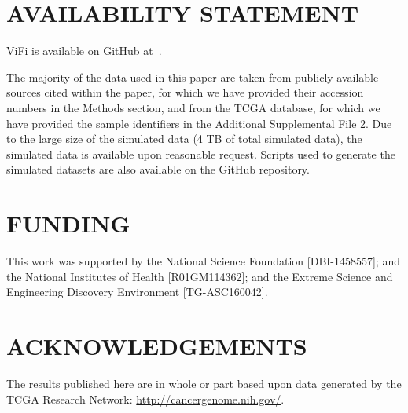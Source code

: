 \documentclass[a4,center,fleqn]{NAR}
\begin{document}
\section{AVAILABILITY STATEMENT}
ViFi is available on GitHub at~\cite{Nguyen_github}.  

The majority of the data used in this paper are taken from publicly available sources cited within the paper, for which we have provided their accession numbers in the Methods section, and from the TCGA database, for which we have provided the sample identifiers in the Additional Supplemental File 2.  Due to the large size of the simulated data (4 TB of total simulated data), the simulated data is available upon reasonable request.  Scripts used to generate the simulated datasets are also available on the GitHub repository.


\section{FUNDING}
This work was supported by the National Science Foundation [DBI-1458557]; and the National Institutes of Health [R01GM114362]; and the Extreme Science and Engineering Discovery Environment [TG-ASC160042].  

\section{ACKNOWLEDGEMENTS}
The results published here are in whole or part based upon data generated by the TCGA Research Network: \href{http://cancergenome.nih.gov/}{http://cancergenome.nih.gov/}.
\newpage
\end{document}
